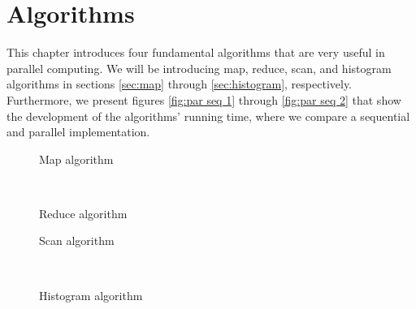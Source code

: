 \chapter{Algorithms}
\label{chap:algorithms}

This chapter introduces four fundamental algorithms that are very useful in parallel computing.
We will be introducing map, reduce, scan, and histogram algorithms in sections \ref{sec:map} through \ref{sec:histogram}, respectively.
Furthermore, we present figures \ref{fig:par seq 1} through \ref{fig:par seq 2} that show the development of the algorithms' running time, where we compare a sequential and parallel implementation.

\begin{figure*}[t]
  \centering
  \begin{subfigure}[b]{.49\linewidth}
    \centering
    \resizebox{!}{.80\textwidth}{
      
    }
    \caption{Map algorithm}
    \label{fig:par seq map}
  \end{subfigure}%
  ~
  \begin{subfigure}[b]{.49\linewidth}
    \centering
    \resizebox{!}{.80\textwidth}{
      
    }
    \caption{Reduce algorithm}
    \label{fig:par seq reduce}
  \end{subfigure}%
  \caption{Comparing parallel and sequential algorithms (1 of 2)}
  \label{fig:par seq 1}
\end{figure*}

\begin{figure*}[t]
  \centering
  \begin{subfigure}[b]{.49\linewidth}
    \centering
    \resizebox{!}{.80\textwidth}{
      
    }
    \caption{Scan algorithm}
    \label{fig:par seq scan}
  \end{subfigure}%
  ~
  \begin{subfigure}[b]{.49\linewidth}
    \centering
    \resizebox{!}{.80\textwidth}{
      
    }
    \caption{Histogram algorithm}
    \label{fig:par seq histogram}
  \end{subfigure}%
  \caption{Comparing parallel and sequential algorithms (2 of 2)}
  \label{fig:par seq 2}
\end{figure*}





